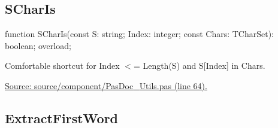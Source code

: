 \documentclass{report}
\newif\ifpdf
\begin{document}
\subsection*{SCharIs}
\fi
\label{PasDoc_Utils-SCharIs}
\begin{list}{}{
\setlength{\itemindent}{0cm}
\setlength{\listparindent}{0cm}
\setlength{\leftmargin}{\evensidemargin}
\addtolength{\leftmargin}{\tmplength}
\settowidth{\labelsep}{X}
\addtolength{\leftmargin}{\labelsep}
\setlength{\labelwidth}{\tmplength}
}
\item[\textbf{Declaration}\hfill]
\ifpdf
\begin{flushleft}
\fi
\begin{ttfamily}
function SCharIs(const S: string; Index: integer; const Chars: TCharSet): boolean; overload;\end{ttfamily}

\ifpdf
\end{flushleft}
\fi

\par
\item[\textbf{Description}]
Comfortable shortcut for Index {$<$}= Length(S) and S[Index] in Chars.\par
\href{https://github.com/pasdoc/pasdoc/blob/master/source/component/PasDoc_Utils.pas#L64}{Source: source/component/PasDoc{\_}Utils.pas (line 64).}

\end{list}
\ifpdf
\subsection*{\large{\textbf{ExtractFirstWord}}\normalsize\hspace{1ex}\hrulefill}
\else
\end{document}
